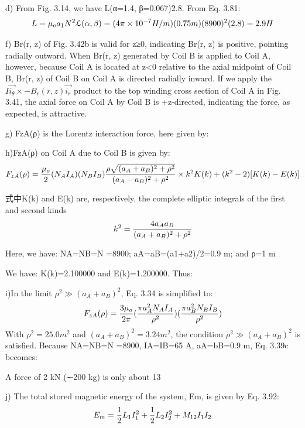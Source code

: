 d) From Fig. 3.14, we have L(α=1.4, β=0.067)2.8. From Eq. 3.81:
$$
L=\mu_{o}a_{1}N^{2}\mathcal{L}(\alpha,\beta)\\%
=(4\pi\times10^{-7}H/m)(0.75m)(8900)^{2}(2.8)=2.9H\\
$$

f) Br(r, z) of Fig. 3.42b is valid for z≥0, indicating Br(r, z) is positive, pointing
radially outward. When Br(r, z) generated by Coil B is applied to Coil A, however,
because Coil A is located at z<0 relative to the axial midpoint of Coil B, Br(r, z)
of Coil B on Coil A is directed radially inward. If we apply the $I\vec{i_\theta}\times-B_r(r,z)\vec{i_r}$
product to the top winding cross section of Coil A in Fig. 3.41, the axial force on
Coil A by Coil B is +z-directed, indicating the force, as expected, is attractive.

g) FzA(ρ) is the Lorentz interaction force, here given by:

h)FzA(ρ) on Coil A due to Coil B is given by:
$$
F_{zA}(\rho)=\frac{\mu_{o}}{2}(N_{A}I_{A})(N_{B}I_{B})\frac{\rho\sqrt{(a_{A}+a_{B})^{2}+\rho^{2}}}{(a_{A}-a_{B})^{2}+\rho^{2}}\\
\times{k^{2}K(k)+(k^{2}-2)[K(k)-E(k)]}\\%
$$

式中K(k) and E(k) are, respectively, the complete elliptic integrals of the first
and second kinds
$$
k^{2}=\frac{4a_{A}a_{B}}{(a_{A}+a_{B})^{2}+\rho^{2}}\\%
$$

Here, we have: NA=NB=N =8900; aA=aB=(a1+a2)/2=0.9 m; and ρ=1 m

We have: K(k)=2.100000 and E(k)=1.200000. Thus:



i)In the limit $ρ^2\gg(a_A+a_B)^2$, Eq. 3.34 is simplified to:
$$
F_{zA}(\rho)=\frac{3\mu_{o}}{2\pi}(\frac{\pi a_{A}^{2}N_{A}I_{A}}{\rho^{2}})(\frac{\pi a_{B}^{2}N_{B}I_{B}}{\rho^{2}})\\%
$$
With $ρ^2=25.0 m^2$ and $(a_A+a_B)^2=3.24 m^2$, the condition $ρ^2\gg(a_A+a_B)^2$ is satisfied.
Because NA=NB=N =8900, IA=IB=65 A, aA=bB=0.9 m, Eq. 3.39c becomes:

A force of 2 kN (∼200 kg) is only about 13%

j) The total stored magnetic energy of the system, Em, is given by Eq. 3.92:
$$
E_{m}=\frac{1}{2}L_{1}I_{1}^{2}+\frac{1}{2}L_{2}I_{2}^{2}+M_{12}I_{1}I_{2}\\%
$$

